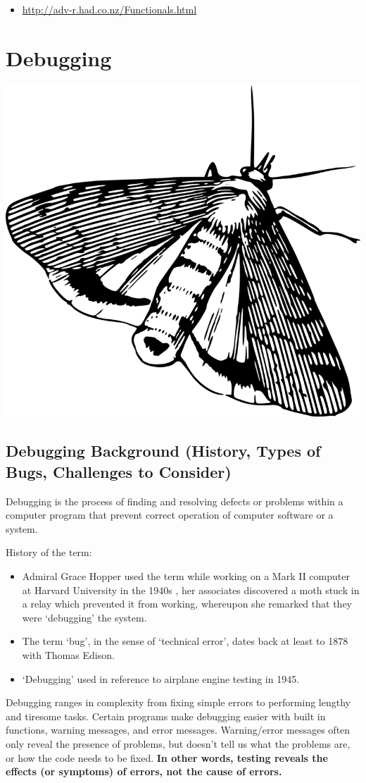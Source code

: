 \documentclass[
]{book}
\providecommand{\tightlist}{%
  \setlength{\itemsep}{0pt}\setlength{\parskip}{0pt}}
\begin{document}
\begin{itemize}
\tightlist
\item
  \url{http://adv-r.had.co.nz/Functionals.html}
\end{itemize}

\hypertarget{debugging}{%
\chapter{Debugging}\label{debugging}}

\begin{center}\includegraphics[width=0.25\linewidth]{images/moth} \end{center}

\hypertarget{debugging-background-history-types-of-bugs-challenges-to-consider}{%
\section{Debugging Background (History, Types of Bugs, Challenges to Consider)}\label{debugging-background-history-types-of-bugs-challenges-to-consider}}

Debugging is the process of finding and resolving defects or problems within a computer program that prevent correct operation of computer software or a system.

History of the term:

\begin{itemize}
\item
  Admiral Grace Hopper used the term while working on a Mark II computer at Harvard University in the 1940s , her associates discovered a moth stuck in a relay which prevented it from working, whereupon she remarked that they were `debugging' the system.
\item
  The term `bug', in the sense of `technical error', dates back at least to 1878 with Thomas Edison.
\item
  `Debugging' used in reference to airplane engine testing in 1945.
\end{itemize}

Debugging ranges in complexity from fixing simple errors to performing lengthy and tiresome tasks. Certain programs make debugging easier with built in functions, warning messages, and error messages. Warning/error messages often only reveal the presence of problems, but doesn't tell us what the problems are, or how the code needs to be fixed. \textbf{In other words, testing reveals the effects (or symptoms) of errors, not the cause of errors.}
\end{document}

